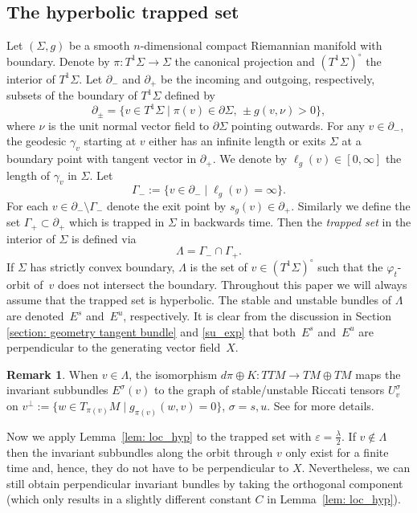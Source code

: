 \documentclass[10pt]{amsart}
\let\sep\mid
\newcommand{\elg}{\ell_g}
\theoremstyle{definition}
\newtheorem{remark}[theorem]{Remark}
\let\phi\varphi
\let\eps\varepsilon
\renewcommand{\>}{{\rangle}}
\newcommand{\<}{{\langle}}
\begin{document}
\subsection{The hyperbolic trapped set}\label{prel: hyp_trapped_sets}
Let $(\Sigma,g)$ be a smooth $n$-dimensional compact Riemannian manifold with boundary. Denote by $\pi: T^1{\Sigma}\to \Sigma$ the canonical projection and
$\left(T^1\Sigma\right)^\circ$ the interior of $T^1\Sigma$. Let $\partial_{-}$ and $\partial_{+}$ be the incoming and outgoing, respectively, subsets of the boundary of $T^1\Sigma$ defined by
\[
\partial_{\pm} =\{v\in T^1\Sigma\sep \pi(v)\in\partial\Sigma, \, \pm g(v,\nu)>0\},
\]
where $\nu$ is the unit normal vector field to $\partial\Sigma$ pointing outwards. For any $v\in \partial_-$, the geodesic $\gamma_v$ starting at $v$ either has an infinite length or exits $\Sigma$ at a boundary point with tangent vector
in $\partial_+$. We denote by $\elg(v)\in [0,\infty]$ the length of $\gamma_{v}$ in $\Sigma$. Let
\[
\Gamma_{-}:=\{v\in \partial_{-}\sep \elg(v)=\infty\}.
\]
For each $v\in\partial_-\setminus \Gamma_-$ denote the exit point by $s_g(v)\in\partial_+$. Similarly we define the set $\Gamma_+\subset\partial_+$ which is trapped in $\Sigma$ in backwards time. Then the {\it trapped set} in the interior of $\Sigma$ is defined via
\[
\Lambda=\Gamma_-\cap \Gamma_+.
\]
If $\Sigma$ has strictly convex boundary, $\Lambda$ is the set of $v\in (T^1\Sigma)^\circ$ such that the $\phi_t$-orbit of~$v$ does not intersect the boundary. Throughout this paper we will always assume that the trapped set is hyperbolic. The stable and unstable bundles of $\Lambda$ are denoted~$E^s$ and~$E^u$, respectively. It is clear from
the discussion in Section \ref{section: geometry tangent bundle} and \eqref{su_exp} that both~$E^s$ and~$E^u$ are perpendicular to the generating vector field~$X$.

\begin{remark}\label{rem: U+-}
When $v\in\Lambda$, the isomorphism $d\pi\oplus K: TTM\to TM\oplus TM$ maps the invariant subbundles $E^{\sigma}(v)$ to the graph of stable/unstable Riccati
tensors $U^{\sigma}_v$ on $v^{\bot} := \{w\in T_{\pi(v)}M\sep g_{\pi(v)}(w,v)=0\}$, $\sigma=s,u$. See \cite{E73} for more details.
\end{remark}

Now we apply Lemma~\ref{lem: loc_hyp} to the trapped set with $\eps=\frac{\lambda}{2}$. If $v\notin\Lambda$ then the invariant subbundles along the orbit through $v$ only exist for a finite time and, hence,
they do not have to be perpendicular to $X$. Nevertheless, we can still
obtain perpendicular invariant bundles by taking the orthogonal component (which only results in a slightly different constant $C$ in Lemma~\ref{lem: loc_hyp}).
\end{document}
